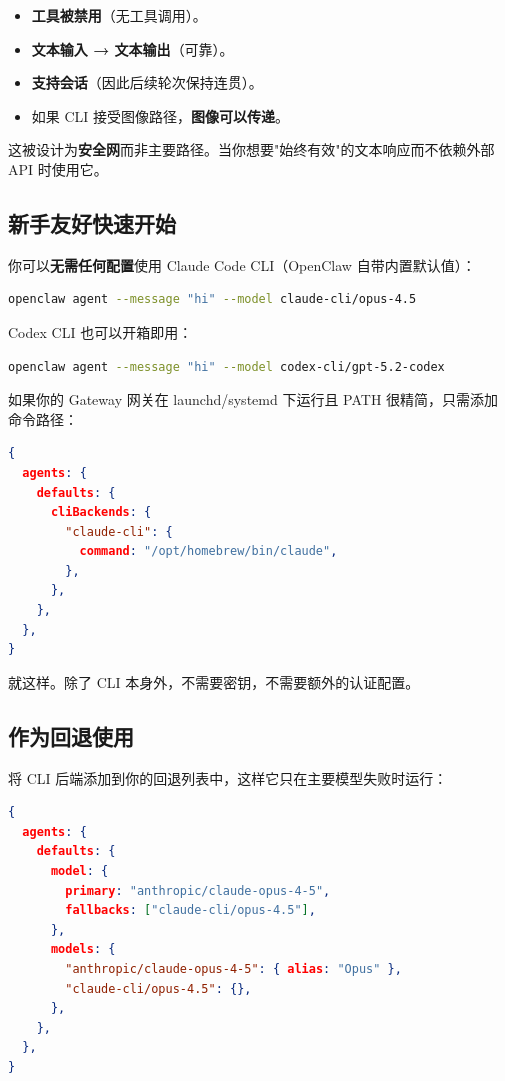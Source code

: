 \begin{itemize}
  \item \textbf{工具被禁用}（无工具调用）。
  \item \textbf{文本输入 → 文本输出}（可靠）。
  \item \textbf{支持会话}（因此后续轮次保持连贯）。
  \item 如果 CLI 接受图像路径，\textbf{图像可以传递}。
\end{itemize}


这被设计为\textbf{安全网}而非主要路径。当你想要"始终有效"的文本响应而不依赖外部 API 时使用它。

\subsection{新手友好快速开始}


你可以\textbf{无需任何配置}使用 Claude Code CLI（OpenClaw 自带内置默认值）：

\begin{lstlisting}[language=bash]
openclaw agent --message "hi" --model claude-cli/opus-4.5
\end{lstlisting}


Codex CLI 也可以开箱即用：

\begin{lstlisting}[language=bash]
openclaw agent --message "hi" --model codex-cli/gpt-5.2-codex
\end{lstlisting}


如果你的 Gateway 网关在 launchd/systemd 下运行且 PATH 很精简，只需添加命令路径：

\begin{lstlisting}[language=json]
{
  agents: {
    defaults: {
      cliBackends: {
        "claude-cli": {
          command: "/opt/homebrew/bin/claude",
        },
      },
    },
  },
}
\end{lstlisting}


就这样。除了 CLI 本身外，不需要密钥，不需要额外的认证配置。

\subsection{作为回退使用}


将 CLI 后端添加到你的回退列表中，这样它只在主要模型失败时运行：

\begin{lstlisting}[language=json]
{
  agents: {
    defaults: {
      model: {
        primary: "anthropic/claude-opus-4-5",
        fallbacks: ["claude-cli/opus-4.5"],
      },
      models: {
        "anthropic/claude-opus-4-5": { alias: "Opus" },
        "claude-cli/opus-4.5": {},
      },
    },
  },
}
\end{lstlisting}



